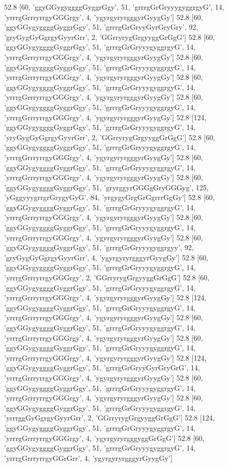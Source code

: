 52.8 [60, 'ggyGGygyggggGyggrGgy', 51, 'grrrgGrGryyygyggrgyG', 14, 'yrrrgGrrryrrgyGGGrgy', 4, 'ygyrgyryrgggyrGyygGy']
52.8 [60, 'ggyGGygyggggGyggrGgy', 51, 'grrrgGrGryyGyrGryGry', 92, 'gryGygGyGgrgyGyyrGrr', 2, 'GGrryrygGrgyyggGrGgG']
52.8 [60, 'ggyGGygyggggGyggrGgy', 51, 'grrrgGrGryyygyggrgyG', 14, 'yrrrgGrrryrrgyGGGrgy', 4, 'ygyrgyryrgggyrGyygGy']
52.8 [60, 'ggyGGygyggggGyggrGgy', 51, 'grrrgGrGryyygyggrgyG', 14, 'yrrrgGrrryrrgyGGGrgy', 4, 'ygyrgyryrgggyrGyygGy']
52.8 [60, 'ggyGGygyggggGyggrGgy', 51, 'grrrgGrGryyygyggrgyG', 14, 'yrrrgGrrryrrgyGGGrgy', 4, 'ygyrgyryrgggyrGyygGy']
52.8 [60, 'ggyGGygyggggGyggrGgy', 51, 'grrrgGrGryyygyggrgyG', 14, 'yrrrgGrrryrrgyGGGrgy', 4, 'ygyrgyryrgggyrGyygGy']
52.8 [124, 'ggyGGygyggggGyggrGgy', 51, 'grrrgGrGryyygyggrgyG', 14, 'yryGygGyGgrgyGyyrGrr', 2, 'GGrryrygGrgyyggGrGgG']
52.8 [60, 'ggyGGygyggggGyggrGgy', 51, 'grrrgGrGryyygyggrgyG', 14, 'yrrrgGrrryrrgyGGGrgy', 4, 'ygyrgyryrgggyrGyygGy']
52.8 [60, 'ggyGGygyggggGyggrGgy', 51, 'grrrgGrGryyygyggrgyG', 14, 'yrrrgGrrryrrgyGGGrgy', 4, 'ygyrgyryrgggyrGyygGy']
52.8 [60, 'ggyGGygyggggGyggrGgy', 51, 'gryrggyrGGGgGryGGGyg', 125, 'yGggyyygrrgrGrygyGyG', 84, 'yrgygyGrgGrGgrrrGgGy']
52.8 [60, 'ggyGGygyggggGyggrGgy', 51, 'grrrgGrGryyygyggrgyG', 14, 'yrrrgGrrryrrgyGGGrgy', 4, 'ygyrgyryrgggyrGyygGy']
52.8 [60, 'ggyGGygyggggGyggrGgy', 51, 'grrrgGrGryyygyggrgyG', 14, 'yrrrgGrrryrrgyGGGrgy', 4, 'ygyrgyryrgggyrGyygGy']
52.8 [60, 'ggyGGygyggggGyggrGgy', 51, 'grrrgGrGryyygyggrgyy', 92, 'gryGygGyGgrgyGyyrGrr', 4, 'ygyrgyryrgggyrGyygGy']
52.8 [60, 'ggyGGygyggggGyggrGgy', 51, 'grrrgGrGryyygyggrgyG', 14, 'yrrrgGrrryrrgyGGGrgy', 2, 'GGrryrygGrgyyggGrGgG']
52.8 [60, 'ggyGGygyggggGyggrGgy', 51, 'grrrgGrGryyygyggrgyG', 14, 'yrrrgGrrryrrgyGGGrgy', 4, 'ygyrgyryrgggyrGyygGy']
52.8 [124, 'ggyGGygyggggGyggrGgy', 51, 'grrrgGrGryyygyggrgyG', 14, 'yrrrgGrrryrrgyGGGrgy', 4, 'ygyrgyryrgggyrGyygGy']
52.8 [60, 'ggyGGygyggggGyggrGgy', 51, 'grrrgGrGryyygyggrgyG', 14, 'yrrrgGrrryrrgyGGGrgy', 4, 'ygyrgyryrgggyrGyygGy']
52.8 [60, 'ggyGGygyggggGyggrGgy', 51, 'grrrgGrGryyygyggrgyG', 14, 'yrrrgGrrryrrgyGGGrgy', 4, 'ygyrgyryrgggyrGyygGy']
52.8 [124, 'ggyGGygyggggGyggrGgy', 51, 'grrrgGrGryyGyrGryGrG', 14, 'yrrrgGrrryrrgyGGGrgy', 4, 'ygyrgyryrgggyrGyygGy']
52.8 [60, 'ggyGGygyggggGyggrGgy', 51, 'grrrgGrGryyygyggrgyG', 14, 'yrrrgGrrryrrgyGGGrgy', 4, 'ygyrgyryrgggyrGyygGy']
52.8 [60, 'ggyGGygyggggGyggrGgy', 51, 'grrrgGrGryyygyggrgyG', 14, 'yrrrggGyGgrgyGyyrGrr', 2, 'GGrryrygGrgyyggGrGgG']
52.8 [124, 'ggyGGygyggggGyggrGgy', 51, 'grrrgGrGryyygyggrgyG', 14, 'yrrrgGrrryrrgyGGGrgy', 4, 'ygyrgyryrgggyggGrGgG']
52.8 [60, 'ggyGGygyggggGyggrGgy', 51, 'grrrgGrGryyygyggrgyG', 14, 'yrrrgGrrryrrgyGGrGrr', 4, 'ygyrgyryrgggyrGyygGy']
